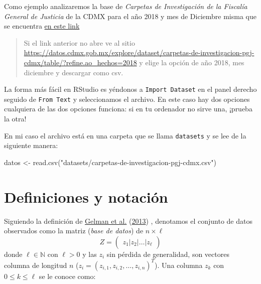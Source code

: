 \documentclass[
]{book}
\newenvironment{Shaded}{\begin{snugshade}}{\end{snugshade}}
\newcommand{\FunctionTok}[1]{\textcolor[rgb]{0.00,0.00,0.00}{#1}}
\newcommand{\NormalTok}[1]{#1}
\newcommand{\OtherTok}[1]{\textcolor[rgb]{0.56,0.35,0.01}{#1}}
\newcommand{\StringTok}[1]{\textcolor[rgb]{0.31,0.60,0.02}{#1}}
\begin{document}
Como ejemplo analizaremos la base de \emph{Carpetas de Investigación de la Fiscalía General de Justicia} de la CDMX para el año 2018 y mes de Diciembre misma que se encuentra \href{https://datos.cdmx.gob.mx/explore/dataset/carpetas-de-investigacion-pgj-cdmx/download/?format=csv\&refine.ao_hechos=2018\&refine.mes_hechos=Diciembre\&timezone=America/Mexico_City\&lang=es\&use_labels_for_header=true\&csv_separator=\%2C}{en este link}

\begin{quote}
Si el link anterior no abre ve al sitio \url{https://datos.cdmx.gob.mx/explore/dataset/carpetas-de-investigacion-pgj-cdmx/table/?refine.ao_hechos=2018} y elige la opción de año 2018, mes diciembre y descargar como csv.
\end{quote}

La forma más fácil en RStudio es yéndonos a \texttt{Import\ Dataset} en el panel derecho seguido de \texttt{From\ Text} y seleccionamos el archivo. En este caso hay dos opciones cualquiera de las dos opciones funciona: si en tu ordenador no sirve una, ¡prueba la otra!

En mi caso el archivo está en una carpeta que se llama \texttt{datasets} y se lee de la siguiente manera:

\begin{Shaded}
\begin{Highlighting}[]
\NormalTok{datos }\OtherTok{\textless{}{-}} \FunctionTok{read.csv}\NormalTok{(}\StringTok{"datasets/carpetas{-}de{-}investigacion{-}pgj{-}cdmx.csv"}\NormalTok{)}
\end{Highlighting}
\end{Shaded}

\hypertarget{definiciones-y-notaciuxf3n}{%
\section{Definiciones y notación}\label{definiciones-y-notaciuxf3n}}

Siguiendo la definición de \protect\hyperlink{ref-gelman2013bayesian}{Gelman et al.} (\protect\hyperlink{ref-gelman2013bayesian}{2013}) , denotamos el conjunto de datos observados como la matriz (\emph{base de datos}) de \(n \times \ell\)
\[
Z = \begin{pmatrix} 
z_1 \Big| z_2 \Big| \dots \Big| z_{\ell}
\end{pmatrix}
\]
donde \(\ell \in \mathbb{N}\) con \(\ell > 0\) y las \(z_i\) sin pérdida de generalidad, son vectores columna de longitud \(n\) (\(z_i = (z_{i,1}, z_{i,2}, \dots, z_{i,n})^T\)). Una columna \(z_{k}\) con \(0 \leq k \leq \ell\) se le conoce como:
\end{document}
